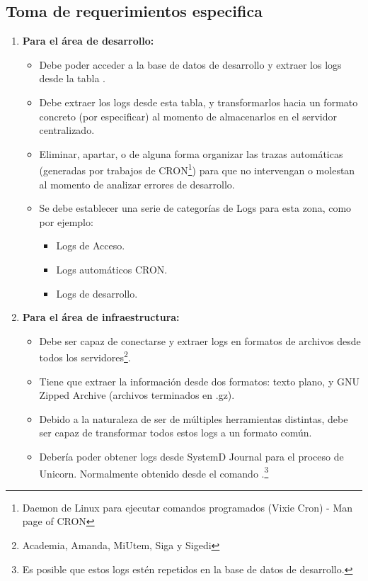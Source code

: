 
\subsection{Toma de requerimientos especifica}

\begin{enumerate}
  \item \textbf{Para el área de desarrollo: }
    \begin{itemize}
      \item Debe poder acceder a la base de datos de desarrollo y extraer los logs desde la tabla .
      \item Debe extraer los logs desde esta tabla, y transformarlos hacia un formato concreto (por especificar) al momento de almacenarlos en el servidor centralizado.
      \item Eliminar, apartar, o de alguna forma organizar las trazas automáticas (generadas por trabajos de CRON\footnote{Daemon de Linux para ejecutar comandos programados (Vixie Cron) - Man page of CRON}) para que no intervengan o molestan al momento de analizar errores de desarrollo.
        \item Se debe establecer una serie de categorías de Logs para esta zona, como por ejemplo:
          \begin{itemize}
            \item Logs de Acceso.
            \item Logs automáticos CRON.
            \item Logs de desarrollo.
          \end{itemize}
    \end{itemize}
    \item \textbf{Para el área de infraestructura: }
      \begin{itemize}
        \item Debe ser capaz de conectarse y extraer logs en formatos de archivos desde todos los servidores\footnote{Academia, Amanda, MiUtem, Siga y Sigedi}.
        \item Tiene que extraer la información desde dos formatos: texto plano, y GNU Zipped Archive (archivos terminados en .gz).
          \item Debido a la naturaleza de ser de múltiples herramientas distintas, debe ser capaz de transformar todos estos logs a un formato común.
          \item Debería poder obtener logs desde SystemD Journal para el proceso de Unicorn. Normalmente obtenido desde el comando .\footnote{Es posible que estos logs estén repetidos en la base de datos de desarrollo.}
      \end{itemize}
\end{enumerate}

\clearpage
